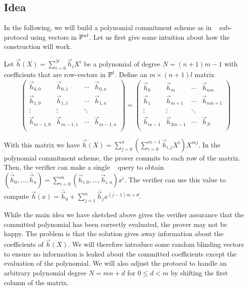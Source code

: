 \subsection{Idea}

In the following, we will build a polynomial commitment scheme as in \ILC~ sub-protocol using vectors in $\mathbb{F}^{nl}$. Let us first give some intuition about how the construction will work. 

Let $\vec{h}(X)=\sum_{i=0}^N\vec{h}_iX^i$ be a polynomial of degree $N=(n+1)m-1$ with coefficients that are row-vectors in $\mathbb{F}^l$. Define an $m\times (n+1)l$ matrix $$
\left(\begin{array}{llll}
\vec{h}_{0,0} & \vec{h}_{0,1} &\cdots & \vec{h}_{0,n} \\
\vec{h}_{1,0} & \vec{h}_{1,1} & \cdots & \vec{h}_{1,n} \\
\vdots & \vdots &  \ddots & \\
\vec{h}_{m-1,0} & \vec{h}_{m-1,1} & \cdots &\vec{h}_{m-1,n}\\
\end{array} \right) = \left(\begin{array}{llll}
\vec{h}_0 & \vec{h}_{m} & \cdots & \vec{h}_{nm} \\
\vec{h}_1 & \vec{h}_{m+1} & \cdots & \vec{h}_{nm+1}\\
\vdots & \vdots & \ddots  & \\
\vec{h}_{m-1} & \vec{h}_{2m-1}  & \cdots  & \vec{h}_{N} \\
\end{array} \right)$$

With this matrix we have $\vec{h}(X)=\sum_{j=0}^n(\sum_{i=0}^{m-1}\vec{h}_{i,j}X^i)X^{mj}$. In the polynomial commitment scheme, the prover commits to each row of the matrix. Then, the verifier can make a single \ILC~ query to obtain $(\bar{\vec{h}}_0,\ldots,\bar{\vec{h}}_n) = \sum_{i=0}^{m} (\vec{h}_{i,0},\ldots,\vec{h}_{i,n}) x^i$. The verifier can use this value to compute $\vec{h}(x) = \bar{\vec{h}}_0+\sum_{j=1}^{n} \bar{\vec{h}}_{j} x^{(j-1)m+d}$.

While the main idea we have sketched above gives the verifier assurance that the committed polynomial has been correctly evaluated, the prover may not be happy. The problem is that the solution gives away information about the coefficients of $\vec{h}(X)$. We will therefore introduce some random blinding vectors to ensure no information is leaked about the committed coefficients except the evaluation of the polynomial. We will also adjust the protocol to handle an arbitrary polynomial degree $N=mn+d$ for $0\leq d<m$ by shifting the first column of the matrix.

